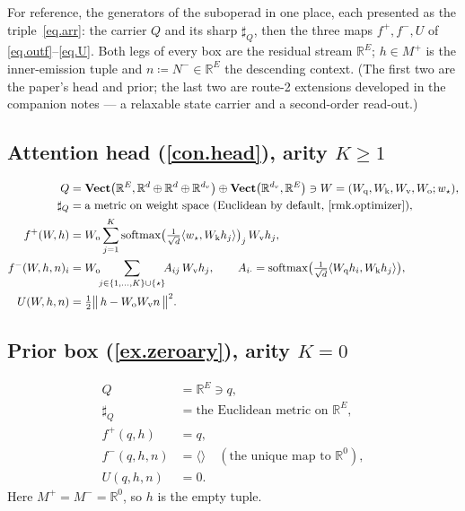 \documentclass[11pt]{article}
\theoremstyle{plain}
\theoremstyle{definition}
\theoremstyle{remark}
\newcommand{\rr}{\mathbb{R}}
\newcommand{\Cat}[1]{\mathbf{#1}}
\newcommand{\vect}{\Cat{Vect}}
\newcommand{\sharpR}{\sharp}
\newcommand{\inpt}[1]{#1^{-}}
\newcommand{\outp}[1]{#1^{+}}
\DeclareMathOperator{\softmax}{softmax}
\newcommand{\Wq}{W_{\mathrm q}}
\newcommand{\Wk}{W_{\mathrm k}}
\newcommand{\Wv}{W_{\mathrm v}}
\newcommand{\Wo}{W_{\mathrm o}}
\begin{document}
For reference, the generators of the suboperad in one place, each presented as
the triple~\eqref{eq.arr}: the carrier $Q$ and its sharp $\sharpR_Q$, then the
three maps $\outp f,\inpt f,U$ of \eqref{eq.outf}--\eqref{eq.U}. Both legs of
every box are the residual stream $\rr^E$; $h\in\outp M$ is the inner-emission
tuple and $n\coloneqq\inpt N\in\rr^E$ the descending context. (The first two are
the paper's head and prior; the last two are route-2 extensions developed in the
companion notes --- a relaxable state carrier and a second-order read-out.)

\subsection*{Attention head (\cref{con.head}), arity $K\ge1$}
\[
\begin{aligned}
  Q          &= \vect\bigl(\rr^E,\rr^{d}\oplus\rr^{d}\oplus\rr^{d_v}\bigr)
                \oplus\vect\bigl(\rr^{d_v},\rr^E\bigr)\ni W=(\Wq,\Wk,\Wv,\Wo;w_\star),\\
  \sharpR_Q  &= \text{a metric on weight space (Euclidean by default, \cref{rmk.optimizer})},\\
  \outp f(W,h)     &= \Wo\sum_{j=1}^{K}\softmax\bigl(\tfrac1{\sqrt d}\langle w_\star,\Wk h_j\rangle\bigr)_j\,\Wv h_j,\\
  \inpt f(W,h,n)_i &= \Wo\!\!\sum_{j\in\{1,\dots,K\}\cup\{\star\}}\!\!A_{ij}\,\Wv h_j,
                     \qquad A_{i\cdot}=\softmax\bigl(\tfrac1{\sqrt d}\langle\Wq h_i,\Wk h_j\rangle\bigr),\\
  U(W,h,n)         &= \tfrac12\bigl\lVert\,h-\Wo\Wv n\,\bigr\rVert^{2}.
\end{aligned}
\]

\subsection*{Prior box (\cref{ex.zeroary}), arity $K=0$}
\[
\begin{aligned}
  Q              &= \rr^{E}\ni q,\\
  \sharpR_Q      &= \text{the Euclidean metric on }\rr^{E},\\
  \outp f(q,h)   &= q,\\
  \inpt f(q,h,n) &= \langle\rangle\quad(\text{the unique map to }\rr^{0}),\\
  U(q,h,n)       &= 0.
\end{aligned}
\]
Here $\outp M=\inpt M=\rr^{0}$, so $h$ is the empty tuple.
\end{document}
